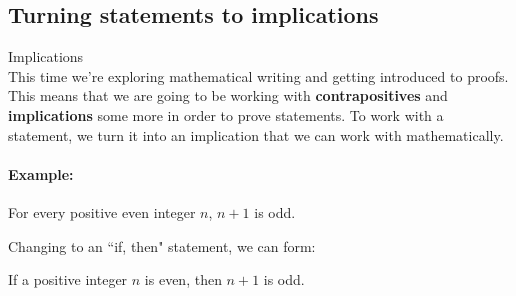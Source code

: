 \documentclass[a4paper,12pt]{book}
\title{}
\author{Rachel Morris}
\date{\today}
\begin{document}
    \togglefalse{answerkey}


    \subsection{Turning statements to implications}

        \begin{intro}{Implications} ~\\
            This time we're exploring mathematical writing and getting introduced
            to proofs. This means that we are going to be working with
            \textbf{contrapositives} and \textbf{implications} some more
            in order to prove statements.
            To work with a statement, we turn it into an implication that
            we can work with mathematically.

            \paragraph{Example:}
            For every positive even integer $n$, $n+1$ is odd.

            Changing to an ``if, then" statement, we can form:

            If a positive integer $n$ is even, then $n+1$ is odd.
        \end{intro}
\end{document}

